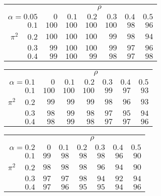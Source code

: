 \begin{tabular}{r|rrrrrr}
\hline\hline
 &\multicolumn{6}{c}{$\rho$} \\ 
 $\alpha = 0.05$ & $0$ & $0.1$ & $0.2$ & $0.3$ & $0.4$ & $0.5$ \\ 
 \hline$0.1$ & $100$ & $100$ & $100$ & $100$ & $ 98$ & $ 96$\\ 
$\pi^2\;\;\;$ $0.2$ & $100$ & $100$ & $100$ & $ 99$ & $ 98$ & $ 94$\\ 
$0.3$ & $ 99$ & $100$ & $100$ & $ 99$ & $ 97$ & $ 96$\\ 
$0.4$ & $ 99$ & $100$ & $ 99$ & $ 98$ & $ 97$ & $ 98$\\ 
 \hline 
 \end{tabular}
 
 \vspace{2em} 
 
\begin{tabular}{r|rrrrrr}
\hline\hline
 &\multicolumn{6}{c}{$\rho$} \\ 
 $\alpha = 0.1$ & $0$ & $0.1$ & $0.2$ & $0.3$ & $0.4$ & $0.5$ \\ 
 \hline$0.1$ & $100$ & $100$ & $100$ & $ 99$ & $ 97$ & $ 93$\\ 
$\pi^2\;\;\;$ $0.2$ & $ 99$ & $ 99$ & $ 99$ & $ 98$ & $ 96$ & $ 93$\\ 
$0.3$ & $ 98$ & $ 99$ & $ 98$ & $ 97$ & $ 95$ & $ 94$\\ 
$0.4$ & $ 98$ & $ 99$ & $ 98$ & $ 97$ & $ 97$ & $ 96$\\ 
 \hline 
 \end{tabular}
 
 \vspace{2em} 
 
\begin{tabular}{r|rrrrrr}
\hline\hline
 &\multicolumn{6}{c}{$\rho$} \\ 
 $\alpha = 0.2$ & $0$ & $0.1$ & $0.2$ & $0.3$ & $0.4$ & $0.5$ \\ 
 \hline$0.1$ & $99$ & $98$ & $98$ & $98$ & $96$ & $90$\\ 
$\pi^2\;\;\;$ $0.2$ & $98$ & $98$ & $98$ & $96$ & $94$ & $90$\\ 
$0.3$ & $97$ & $97$ & $98$ & $94$ & $92$ & $94$\\ 
$0.4$ & $97$ & $96$ & $95$ & $95$ & $94$ & $96$\\ 
 \hline 
 \end{tabular}